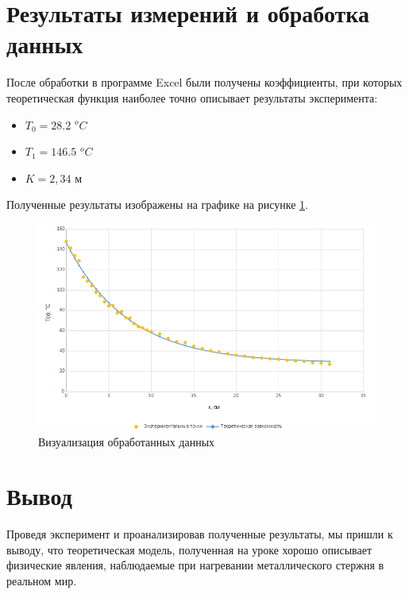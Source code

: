 \documentclass[a4paper,12pt]{article}
\begin{document}
\section{Результаты измерений и обработка данных}

После обработки в программе Excel были получены коэффициенты, при которых теоретическая функция наиболее точно описывает результаты эксперимента:
\begin{itemize}
\item $T_0 = 28.2$ $^oC$
\item $T_1 = 146.5$ $^oC$
\item $K = 2,34$ м
\end{itemize}

Полученные результаты изображены на графике на рисунке \ref{fig:viz}.

\begin{figure}[H]
\centering
\includegraphics[width=1.1\textwidth]{chart}
\caption{Визуализация обработанных данных}
\label{fig:viz}
\end{figure}

\section{Вывод}


Проведя эксперимент и проанализировав полученные результаты, мы пришли к выводу, что теоретическая модель, полученная на уроке хорошо описывает физические явления, наблюдаемые при нагревании металлического стержня в реальном мир.
\end{document}
